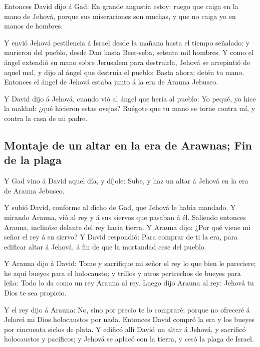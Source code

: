  Entonces David dijo á Gad: En grande angustia estoy: ruego
que caiga en la mano de Jehová, porque sus miseraciones son muchas, y
que no caiga yo en manos de hombres.

 Y envió Jehová pestilencia á Israel desde la mañana hasta
el tiempo señalado: y murieron del pueblo, desde Dan hasta Beer-seba,
setenta mil hombres.  Y como el ángel extendió su mano
sobre Jerusalem para destruirla, Jehová se arrepintió de aquel mal, y
dijo al ángel que destruía el pueblo: Basta ahora; detén tu mano.
Entonces el ángel de Jehová estaba junto á la era de Arauna Jebuseo.

 Y David dijo á Jehová, cuando vió al ángel que hería al
pueblo: Yo pequé, yo hice la maldad: ¿qué hicieron estas ovejas? Ruégote
que tu mano se torne contra mí, y contra la casa de mi padre.

\hypertarget{montaje-de-un-altar-en-la-era-de-arawnas-fin-de-la-plaga}{%
\subsection{Montaje de un altar en la era de Arawnas; Fin de la
plaga}\label{montaje-de-un-altar-en-la-era-de-arawnas-fin-de-la-plaga}}

 Y Gad vino á David aquel día, y díjole: Sube, y haz un
altar á Jehová en la era de Arauna Jebuseo.

 Y subió David, conforme al dicho de Gad, que Jehová le
había mandado.  Y mirando Arauna, vió al rey y á sus
siervos que pasaban á él. Saliendo entonces Arauna, inclinóse delante
del rey hacia tierra.  Y Arauna dijo: ¿Por qué viene mi
señor el rey á su siervo? Y David respondió: Para comprar de ti la era,
para edificar altar á Jehová, á fin de que la mortandad cese del pueblo.

 Y Arauna dijo á David: Tome y sacrifique mi señor el rey
lo que bien le pareciere; he aquí bueyes para el holocausto; y trillos y
otros pertrechos de bueyes para leña:  Todo lo da como un
rey Arauna al rey. Luego dijo Arauna al rey: Jehová tu Dios te sea
propicio.

 Y el rey dijo á Arauna: No, sino por precio te lo
compraré; porque no ofreceré á Jehová mi Dios holocaustos por nada.
Entonces David compró la era y los bueyes por cincuenta siclos de plata.
 Y edificó allí David un altar á Jehová, y sacrificó
holocaustos y pacíficos; y Jehová se aplacó con la tierra, y cesó la
plaga de Israel.
